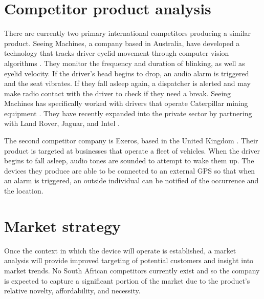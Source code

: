 \section{Competitor product analysis}
\label{sec:competitoranalysis}
There are currently two primary international competitors producing a similar product. Seeing Machines, a company based in Australia, have developed a technology that tracks driver eyelid movement through computer vision algorithms \cite{SeeingMachinesWebsite}. They monitor the frequency and duration of blinking, as well as eyelid velocity. If the driver's head begins to drop, an audio alarm is triggered and the seat vibrates. If they fall asleep again, a dispatcher is alerted and may make radio contact with the driver to check if they need a break. Seeing Machines has specifically worked with drivers that operate Caterpillar mining equipment \cite{SeeingMachinesWired}. They have recently expanded into the private sector by partnering with Land Rover, Jaguar, and Intel \cite{sm_similarities}.

\pagebreak
The second competitor company is Exeros, based in the United Kingdom \cite{Exeros}. Their product is targeted at businesses that operate a fleet of vehicles. When the driver begins to fall asleep, audio tones are sounded to attempt to wake them up. The devices they produce are able to be connected to an external GPS so that when an alarm is triggered, an outside individual can be notified of the occurrence and the location.

\section{Market strategy}
Once the context in which the device will operate is established, a market analysis will provide improved targeting of potential customers and insight into market trends. No South African competitors currently exist and so the company is expected to capture a significant portion of the market due to the product’s relative novelty, affordability, and necessity.

